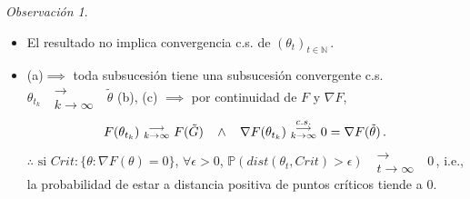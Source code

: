 \documentclass[letterpaper,11pt]{article} %
\def\espacio{\hspace{.25cm}\,}
\theoremstyle{defbreak}
\theoremstyle{propbreak}
\theoremstyle{remark}
\newtheorem{remark}{Observación}[subsection]
\theoremstyle{break}
\def\P{\mathbb{P}}
\def\N{\mathbb{N}}
\def\beforeitemize{\leavevmode \vspace{-0.5\baselineskip}}
\begin{document}
\begin{remark}
\beforeitemize
\begin{itemize}
    \item El resultado no implica convergencia c.s. de $(\theta_t)_{t\in\N}$\,.
    \item (a)$\implies$ toda subsucesión tiene una subsucesión convergente c.s. $\theta_{t_k}\mbox{ }\substack{\longrightarrow \\ k\to\infty}\mbox{ } \tilde{\theta}$
    \newline (b), (c) $\implies$ por continuidad de $F$ y $\nabla F$,
    $$F(\theta_{t_k})\mbox{ }\substack{\longrightarrow \\ k\to\infty}\mbox{ }F(\tilde{G})\espacio\land\espacio \nabla F(\theta_{t_k})\mbox{ }\overset{c.s.}{\substack{\longrightarrow \\k \to \infty}}\mbox{ }0=\nabla F(\tilde{\theta})\,.$$
    \newline $\therefore\mbox{ si }Crit:\{\theta:\nabla F(\theta)=0\}$, $\forall \epsilon>0$, $\P(dist(\theta_t,Crit)>\epsilon)\mbox{ }\substack{\longrightarrow \\ t\to\infty}\mbox{ }0$\espacio, i.e., la probabilidad de estar a distancia positiva de puntos críticos tiende a $0$.
\end{itemize}
\end{remark}
\vspace{.75cm}\\
\end{document}
